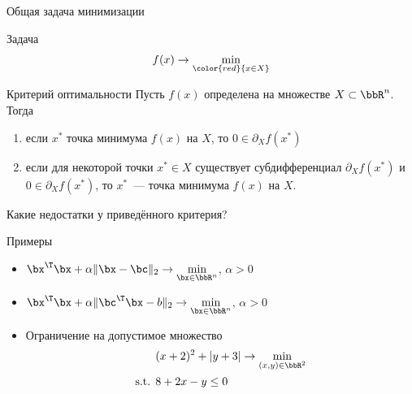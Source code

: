 \documentclass[12pt]{beamer}
\begin{document}
\begin{frame}{Общая задача минимизации}

\begin{block}{Задача}
\[
f(x) \rightarrow \min\limits_{{\color{red}{x \in X}}}
\]
\end{block}

\begin{block}{Критерий оптимальности}
Пусть $f(x)$ определена на множестве $X \subset \bbR^n$.
Тогда 
\begin{enumerate}
\item если $x^*$ точка минимума $f(x)$ на $X$, то $0 \in \partial_X f(x^*)$
\item если для некоторой точки $x^* \in X$ существует субдифференциал $\partial_X f(x^*)$ и $0 \in \partial_X f(x^*)$, то $x^*$~--- точка минимума $f(x)$ на $X$.
\end{enumerate}
\end{block}
Какие недостатки у приведённого критерия?

\end{frame}

\begin{frame}{Примеры}
\begin{itemize}
\item $\bx^{\T}\bx + \alpha \| \bx - 
\bc \|_2 \rightarrow \min\limits_{\bx \in \bbR^n}$, $\alpha > 0$
\item $\bx^{\T}\bx + \alpha \| \bc^{\T}\bx - 
b \|_2 \rightarrow \min\limits_{\bx \in \bbR^n}$, $\alpha > 0$
\item Ограничение на допустимое множество
\begin{equation*}
\begin{split}
\vspace{-4mm}
&(x + 2)^2 + |y + 3| \rightarrow \min\limits_{(x, y) \in \bbR^2}\\
\text{s.t. }& 8 + 2x - y \leq 0
\end{split}
\end{equation*}
\end{itemize}
\end{frame}
\end{document}
